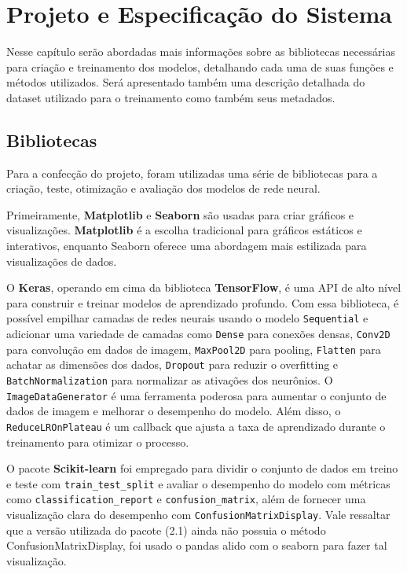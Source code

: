 \chapter{Projeto e Especificação do Sistema}
\label{cha:Projeto e Especificação do Sistema}

Nesse capítulo serão abordadas mais informações sobre as bibliotecas necessárias para criação e treinamento dos modelos, detalhando cada uma de suas funções e métodos utilizados. Será apresentado também uma descrição detalhada do dataset utilizado para o treinamento como também seus metadados.

\section{Bibliotecas}

Para a confecção do projeto, foram utilizadas uma série de bibliotecas para a criação, teste, otimização e avaliação dos modelos de rede neural. 



Primeiramente, \textbf{Matplotlib} e \textbf{Seaborn} são usadas para criar gráficos e visualizações. \textbf{Matplotlib} é a escolha tradicional para gráficos estáticos e interativos, enquanto Seaborn oferece uma abordagem mais estilizada para visualizações de dados.

O \textbf{Keras}, operando em cima da biblioteca \textbf{TensorFlow}, é uma API de alto nível para construir e treinar modelos de aprendizado profundo. Com essa biblioteca, é possível empilhar camadas de redes neurais usando o modelo \verb|Sequential| e adicionar uma variedade de camadas como \verb|Dense| para conexões densas, \verb|Conv2D| para convolução em dados de imagem, \verb|MaxPool2D| para pooling, \verb|Flatten| para achatar as dimensões dos dados, \verb|Dropout| para reduzir o overfitting e \verb|BatchNormalization| para normalizar as ativações dos neurônios. O \verb|ImageDataGenerator| é uma ferramenta poderosa para aumentar o conjunto de dados de imagem e melhorar o desempenho do modelo. Além disso, o \verb|ReduceLROnPlateau| é um callback que ajusta a taxa de aprendizado durante o treinamento para otimizar o processo.

O pacote \textbf{Scikit-learn} foi empregado para dividir o conjunto de dados em treino e teste com \verb|train_test_split| e avaliar o desempenho do modelo com métricas como \verb|classification_report| e \verb|confusion_matrix|, além de fornecer uma visualização clara do desempenho com \verb|ConfusionMatrixDisplay|. Vale ressaltar que a versão utilizada do pacote (2.1) ainda não possuia o método ConfusionMatrixDisplay, foi usado o pandas alido com o seaborn para fazer tal visualização.


